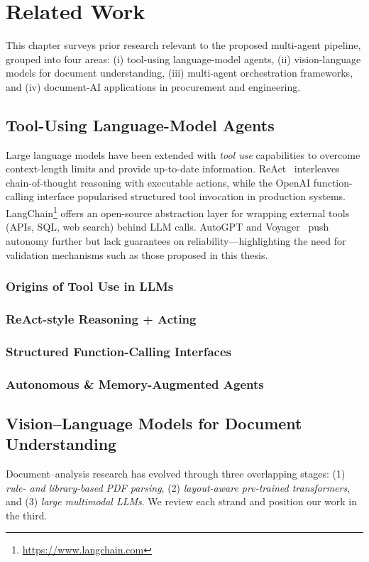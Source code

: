 \chapter{Related Work}\label{chapter:relatedwork}


This chapter surveys prior research relevant to the proposed multi-agent pipeline, grouped into four areas: (i) tool-using language-model agents, (ii) vision-language models for document understanding, (iii) multi-agent orchestration frameworks, and (iv) document-AI applications in procurement and engineering.

\section{Tool-Using Language-Model Agents}
Large language models have been extended with \emph{tool use} capabilities to overcome context-length limits and provide up-to-date information.  
ReAct~\cite{yao2023react} interleaves chain-of-thought reasoning with executable actions, while the OpenAI function-calling interface popularised structured tool invocation in production systems.  
LangChain\footnote{\url{https://www.langchain.com}} offers an open-source abstraction layer for wrapping external tools (APIs, SQL, web search) behind LLM calls.  
AutoGPT and Voyager~\cite{wang2023voyager} push autonomy further but lack guarantees on reliability—highlighting the need for validation mechanisms such as those proposed in this thesis.
\subsection{Origins of Tool Use in LLMs}
\subsection{ReAct-style Reasoning + Acting}
\subsection{Structured Function-Calling Interfaces}
\subsection{Autonomous \& Memory-Augmented Agents}

\section{Vision–Language Models for Document Understanding}
Document–analysis research has evolved through three overlapping stages:  
(1) \emph{rule- and library-based PDF parsing},  
(2) \emph{layout-aware pre-trained transformers}, and  
(3) \emph{large multimodal LLMs}.  
We review each strand and position our work in the third.


